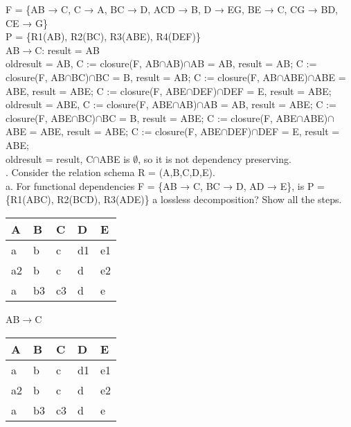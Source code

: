 \documentclass[]{article}
\begin{document}
	\noindent F = \{AB → C, C → A, BC → D, ACD → B, D → EG, BE → C, CG → BD, CE → G\}  \\
	
	\noindent P = \{R1(AB), R2(BC), R3(ABE), R4(DEF)\}   \\
	
	AB$\rightarrow$C: result = AB \\
	
	oldresult = AB, C := closure(F, AB$\cap$AB)$\cap$AB = AB, result = AB; C := closure(F, AB$\cap$BC)$\cap$BC = B, result = AB; C := closure(F, AB$\cap$ABE)$\cap$ABE = ABE, result = ABE; C := closure(F, ABE$\cap$DEF)$\cap$DEF = E, result = ABE;   \\
	
	oldresult = ABE, C := closure(F, ABE$\cap$AB)$\cap$AB = AB, result = ABE; C := closure(F, ABE$\cap$BC)$\cap$BC = B, result = ABE; C := closure(F, ABE$\cap$ABE)$\cap$ABE = ABE, result = ABE; C := closure(F, ABE$\cap$DEF)$\cap$DEF = E, result = ABE;   \\
	
	oldresult = result, C$\cap$ABE is $\emptyset$, so it is not dependency preserving.   \\
	
	. Consider the relation schema R = (A,B,C,D,E).  \\
	
	\noindent a. For functional dependencies F = \{AB → C, BC → D, AD → E\}, is P = \{R1(ABC), R2(BCD), R3(ADE)\} a lossless decomposition? Show all the steps.  \\
	
	\begin{table}[H]
		\begin{tabular}{|l|l|l|l|l|}
			\hline
			A & B & C & D  & E  \\ \hline
			a & b & c & d1 & e1 \\ \hline
			a2 & b & c & d & e2 \\ \hline
			a & b3 & c3 & d & e \\ \hline
		\end{tabular}
	\end{table}

	AB$\rightarrow$C \\
	
	\begin{table}[H]
		\begin{tabular}{|l|l|l|l|l|}
			\hline
			A & B & C & D  & E  \\ \hline
			a & b & c & d1 & e1 \\ \hline
			a2 & b & c & d & e2 \\ \hline
			a & b3 & c3 & d & e \\ \hline
		\end{tabular}
	\end{table}
	
\end{document}
